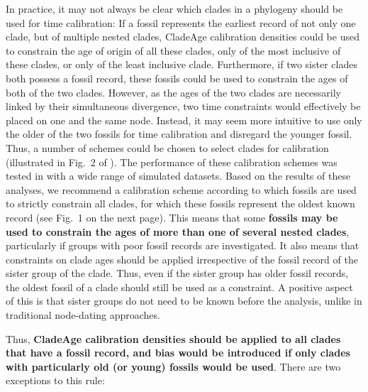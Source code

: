 \documentclass{article}
\begin{document}
In practice, it may not always be clear which clades in a phylogeny should be used for time calibration: If a fossil represents the earliest record of not only one clade, but of multiple nested clades, CladeAge calibration densities could be used to constrain the age of origin of all these clades, only of the most inclusive of these clades, or only of the least inclusive clade. Furthermore, if two sister clades both possess a fossil record, these fossils could be used to constrain the ages of both of the two clades. However, as the ages of the two clades are necessarily linked by their simultaneous divergence, two time constraints would effectively be placed on one and the same node. Instead, it may seem more intuitive to use only the older of the two fossils for time calibration and disregard the younger fossil. Thus, a number of schemes could be chosen to select clades for calibration (illustrated in Fig.\ 2 of \citealt{Matschiner:2016ga}). The performance of these calibration schemes was tested in \citet{Matschiner:2016ga} with a wide range of simulated datasets. Based on the results of these analyses, we recommend a calibration scheme according to which fossils are used to strictly constrain all clades, for which these fossils represent the oldest known record (see Fig.\ 1 on the next page). This means that some \textbf{fossils may be used to constrain the ages of more than one of several nested clades}, particularly if groups with poor fossil records are investigated. It also means that constraints on clade ages should be applied irrespective of the fossil record of the sister group of the clade. Thus, even if the sister group has older fossil records, the oldest fossil of a clade should still be used as a constraint. A positive aspect of this is that sister groups do not need to be known before the analysis, unlike in traditional node-dating approaches.

Thus, \textbf{CladeAge calibration densities should be applied to all clades that have a fossil record, and bias would be introduced if only clades with particularly old (or young) fossils would be used}. There are two exceptions to this rule:
\end{document}
